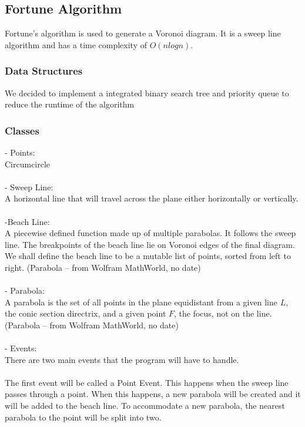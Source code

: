 \documentclass{article}
\begin{document}
\subsection{Fortune Algorithm}
Fortune’s algorithm is used to generate a Voronoi diagram. It is a sweep line algorithm and has a time complexity of \begin{math} O(nlogn).\end{math}\
\subsubsection{Data Structures}
We decided to implement a integrated binary search tree and priority queue to reduce the runtime of the algorithm

\subsubsection{Classes}
- Points:\\
Circumcircle\\\\ - Sweep Line:\\
	A horizontal line that will travel across the plane either horizontally or vertically. \\\\-Beach Line:\\
	A piecewise defined function made up of multiple parabolas. 
	It follows the sweep line. 
	The breakpoints of the beach line lie on Voronoi edges of the final diagram. 
	We shall define the beach line to be a mutable list of points, sorted from left to right. (Parabola -- from Wolfram MathWorld, no date)
	\\\\- Parabola:
	\\A parabola is the set of all points in the plane equidistant from a given line \( L\), the conic section directrix, and a given point \( F\), the focus, not on the line. (Parabola -- from Wolfram MathWorld, no date)
	\\\\- Events:
	\\ There are two main events that the program will have to handle.
	\\\\The first event will be called a Point Event. 
	This happens when the sweep line passes through a point. 
	When this happens, a new parabola will be created and it will be added to the beach line. 
	To accommodate a new parabola, the nearest parabola to the point will be split into two.\\
\end{document}
